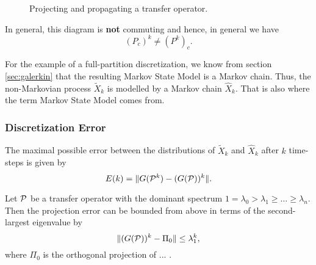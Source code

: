 \begin{figure}[!ht]
	\centering
\caption{Projecting and propagating a transfer operator.}
\label{fig:diagram_transfer}
\end{figure}
In general, this diagram is \textbf{not} commuting and hence, in general we have
\begin{equation*}
(P_c)^k \neq (P^k)_c.
\end{equation*}

For the example of a full-partition discretization, we know from section \ref{sec:galerkin} that the resulting Markov State Model is a Markov chain.
Thus, the non-Markovian process $\widetilde{X}_k$ is modelled by a Markov chain $\widehat{X}_k$.
That is also where the term Markov State Model comes from. 

\subsubsection*{Discretization Error} %
The maximal possible error between the distributions of $\widetilde{X}_k$ and $\widehat{X}_k$ after $k$ time-steps is given by 
\begin{equation*}
E(k) = \Vert G(\mathcal{P}^k) - (G (\mathcal{P}))^k\Vert.
\end{equation*}

\begin{thm} %
Let $\mathcal{P}$ be a transfer operator with the dominant spectrum $1=\lambda_0 > \lambda_1 \geq \dots \geq \lambda_n$.
Then the projection error can be bounded from above in terms of the second-largest eigenvalue by
\begin{equation*}
\Vert (G (\mathcal{P}))^k - \Pi_0\Vert \leq \lambda_1^k,
\end{equation*}
where $\Pi_0$ is the orthogonal projection of ... .
\end{thm}

